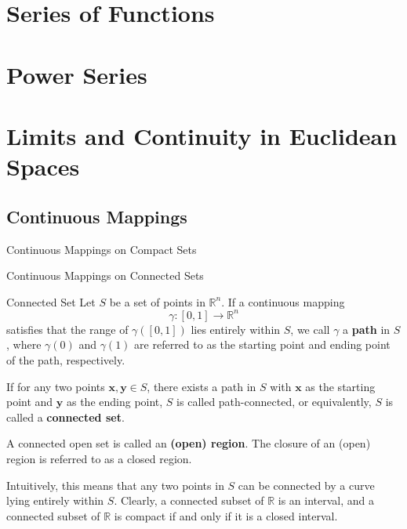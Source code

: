 \documentclass[11pt]{../../TexTemplate/elegantbook}
\begin{document}
\chapter{Series of Functions}

\chapter{Power Series}

\chapter{Limits and Continuity in Euclidean Spaces}

\section{Continuous Mappings}
\begin{leftbarTitle}{Continuous Mappings on Compact Sets}\end{leftbarTitle}

\begin{leftbarTitle}{Continuous Mappings on Connected Sets}\end{leftbarTitle}
\begin{definition}{Connected Set}
    Let \(S\) be a set of points in \(\mathbb{R}^n\). 
    If a continuous mapping 
    \[
        \gamma: [0, 1] \to \mathbb{R}^n
    \]
    satisfies that the range of \(\gamma([0, 1])\) lies entirely within \(S\), 
    we call \(\gamma\) a \textbf{path} in \(S\), 
    where \(\gamma(0)\) and \(\gamma(1)\) are referred to as the starting point and ending point of the path, respectively.  
    
    If for any two points \(\mathbf{x}, \mathbf{y} \in S\), 
    there exists a path in \(S\) with \(\mathbf{x}\) as the starting point and \(\mathbf{y}\) as the ending point, 
    \(S\) is called path-connected, or equivalently, \(S\) is called a \textbf{connected set}.  
    
    A connected open set is called an \textbf{(open) region}. The closure of an (open) region is referred to as a closed region.
\end{definition}

\begin{remark}
    Intuitively, this means that any two points in \(S\) can be connected 
    by a curve lying entirely within \(S\). 
    Clearly, a connected subset of \(\mathbb{R}\) is an interval, 
    and a connected subset of \(\mathbb{R}\) is compact if and only if it is a closed interval.
\end{remark}
\end{document}
